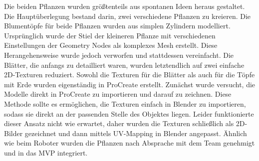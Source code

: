 Die beiden Pflanzen wurden größtenteils aus spontanen Ideen heraus gestaltet. Die Hauptüberlegung bestand darin, zwei verschiedene Pflanzen zu kreieren. Die Blumentöpfe für beide Pflanzen wurden aus simplen Zylindern modelliert. Ursprünglich wurde der Stiel der kleineren Pflanze mit verschiedenen Einstellungen der Geometry Nodes als komplexes Mesh erstellt. \cite{Blender 3.0 Beginner Geometry Nodes Tutorial} Diese Herangehensweise wurde jedoch verworfen und stattdessen vereinfacht. Die Blätter, die anfangs zu detailliert waren, wurden letztendlich auf zwei einfache 2D-Texturen reduziert. Sowohl die Texturen für die Blätter als auch für die Töpfe mit Erde wurden eigenständig in ProCreate erstellt. Zunächst wurde versucht, die Modelle direkt in ProCreate zu importieren und darauf zu zeichnen. Diese Methode sollte es ermöglichen, die Texturen einfach in Blender zu importieren, sodass sie direkt an der passenden Stelle des Objektes liegen. Leider funktionierte dieser Ansatz nicht wie erwartet, daher wurden die Texturen schließlich als 2D-Bilder gezeichnet und dann mittels UV-Mapping in Blender angepasst. Ähnlich wie beim Roboter wurden die Pflanzen nach Absprache mit dem Team genehmigt und in das MVP integriert.
